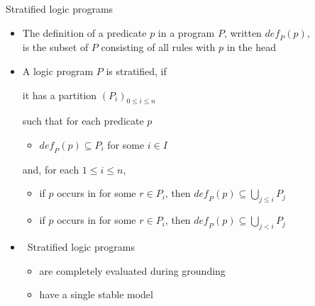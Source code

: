 \begin{frame}{Stratified logic programs}
  \bigskip
  \begin{itemize}
  \item<only@2-5> The \alert{definition} of a predicate $p$ in a program $P$, written $\mathit{def}_P(p)$,
    \\
    is the subset of $P$ consisting of all rules with $p$ in the head
    \medskip
  \item<3-> A logic program $P$ is \alert{stratified}, if
    {it has a partition
    \(
    (P_i)_{0\leq i\leq n}
    \)

    such that for each predicate $p$
    \begin{itemize}\normalsize
    \item $\mathit{def}_P(p)\subseteq P_i$ for some $i\in I$
    \end{itemize}
    and, for each $1\leq i\leq n$,
    \begin{itemize}\normalsize
    \item if $p$ occurs in  for some $r\in P_i$, then $\mathit{def}_P(p)\subseteq\bigcup_{j\leq i} P_j$
    \item if $p$ occurs in  for some $r\in P_i$, then $\mathit{def}_P(p)\subseteq\bigcup_{j  <  i} P_j$
    \end{itemize}}
  \medskip
  \item<4->  \
    Stratified logic programs
    \begin{itemize}\normalsize
    \item are \alert{completely evaluated} during grounding
    \item <5-> have a single stable model
    \end{itemize}
  \end{itemize}
\end{frame}
%
